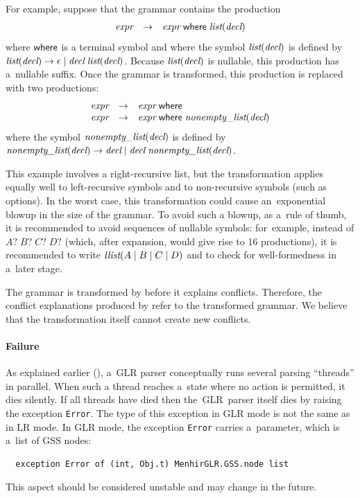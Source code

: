 For example,
suppose that the grammar contains the production
%
\[\begin{array}{rcl}
\textit{expr} & \rightarrow & \textit{expr} \; \textsf{where} \; \textit{list}(\textit{decl})
\end{array}\]
%
where
$\textsf{where}$ is a terminal symbol
and
where
the symbol $\textit{list}(\textit{decl})$
is defined by
$\textit{list}(\textit{decl}) \rightarrow \epsilon \mid \textit{decl} \; \textit{list}(\textit{decl})$.
%
Because $\textit{list}(\textit{decl})$ is nullable, %
this production has a~nullable suffix.
%
Once the grammar is transformed,
this production is replaced with two productions:
%
\[\begin{array}{rcl}
\textit{expr} & \rightarrow & \textit{expr} \; \textsf{where} \\
\textit{expr} & \rightarrow & \textit{expr} \; \textsf{where} \; \textit{nonempty\_list}(\textit{decl})
\end{array}\]
%
where the symbol $\textit{nonempty\_list}(\textit{decl})$
is defined by
$\textit{nonempty\_list}(\textit{decl}) \rightarrow \textit{decl} \mid \textit{decl} \; \textit{nonempty\_list}(\textit{decl})$.

This example involves a right-recursive list,
but the transformation applies equally well
to left-recursive symbols
and to non-recursive symbols (such as options).
%
In the worst case,
this transformation could cause an~exponential blowup
in the size of the grammar.
%
To avoid such a blowup,
as a~rule of thumb,
it is recommended to avoid sequences of nullable symbols:
for~example,
instead of $A? \; B? \; C? \; D?$
(which, after expansion, would give rise to 16 productions),
it is recommended to write
$\textit{llist}(A \mid B \mid C \mid D)$
and to check for well-formedness
in a~later stage.

The grammar is transformed by \menhir before it explains conflicts.
Therefore, the conflict explanations produced by \menhir refer to
the transformed grammar.
%
We believe
that the transformation itself cannot create new conflicts.

\paragraph{Failure}

As explained earlier (),
a~GLR parser conceptually runs
several parsing ``threads''
in parallel.
%
When such a thread reaches a~state where no action is permitted,
it dies silently.
%
%
If all threads have died then
the~GLR~parser itself dies
by raising the exception \texttt{Error}.
%
The type of this exception in GLR mode
is not the same as in LR mode.
%
In GLR mode,
the exception \texttt{Error}
carries a~parameter,
which is a~list of GSS nodes:
%
\begin{verbatim}
  exception Error of (int, Obj.t) MenhirGLR.GSS.node list
\end{verbatim}
%
This aspect should be considered unstable
and may change in the future.


